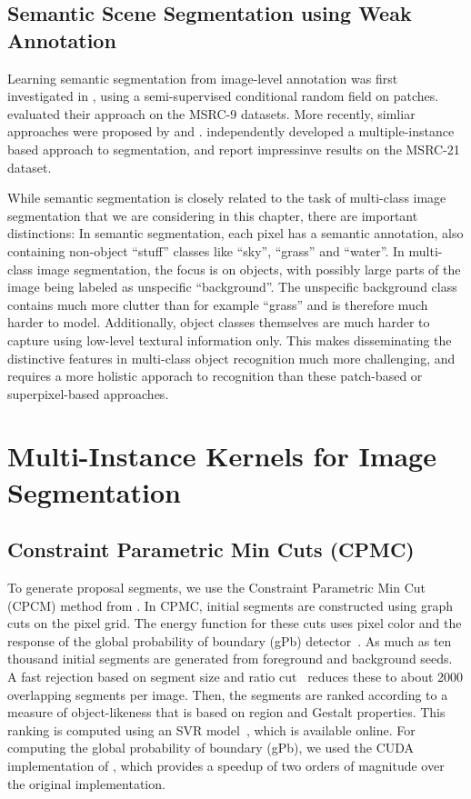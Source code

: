 \subsection{Semantic Scene Segmentation using Weak Annotation}
Learning semantic segmentation from image-level annotation was first investigated in \citet{verbeek2007region},
using a semi-supervised conditional random field on patches. \citet{verbeek2007region} evaluated their approach
on the MSRC-9 datasets.
More recently, simliar approaches were proposed by
\citet{vezhnevets2011weakly} and \citet{vezhnevets2010towards}.
\citet{vezhnevets2011weakly} independently developed a multiple-instance based
approach to segmentation, and report impressinve results on the MSRC-21 dataset.

While semantic segmentation is closely related to the task of multi-class image
segmentation that we are considering in this chapter, there are important
distinctions: In semantic segmentation, each pixel has a semantic annotation,
also containing non-object ``stuff'' classes like ``sky'', ``grass'' and
``water''. In multi-class image segmentation, the focus is on objects, with
possibly large parts of the image being labeled as unspecific ``background''.
The unspecific background class contains much more clutter than for example
``grass'' and is therefore much harder to model. Additionally, object classes
themselves are much harder to capture using low-level textural information
only.  This makes disseminating the distinctive features in multi-class object
recognition much more challenging, and requires a more holistic apporach to
recognition than these patch-based or superpixel-based approaches.


\section{Multi-Instance Kernels for Image Segmentation}
\subsection{Constraint Parametric Min Cuts (CPMC)}
To generate proposal segments, we use the Constraint Parametric Min Cut (CPCM)
method from \citet{carreira2010constrained}. In CPMC, initial segments are
constructed using graph cuts on the pixel grid. The energy function for these cuts
uses pixel color and the response of the global probability of boundary (gPb)
detector~\citep{maire2008using}. As much as ten thousand initial segments are
generated from foreground and background seeds. A fast rejection based on
segment size and ratio cut~\citep{wang2003image} reduces these to about 2000
overlapping segments per image. Then, the segments are ranked according to a
measure of object-likeness that is based on region and Gestalt properties.
This ranking is computed using an SVR model~\citep{carreira2010constrained},
which is available online. 
For computing the global probability of boundary
(gPb), we used the CUDA implementation of \citet{catanzaro2009efficient}, which
provides a speedup of two orders of magnitude over the original implementation.

